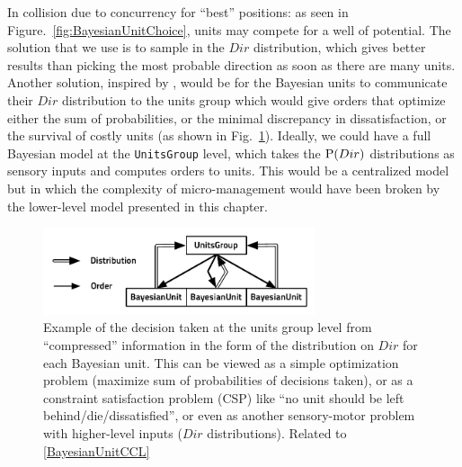 In collision due to concurrency for ``best'' positions: as seen in Figure.~\ref{fig:BayesianUnitChoice}, units may compete for a well of potential. The solution that we use is to sample in the $Dir$ distribution, which gives better results than picking the most probable direction as soon as there are many units. Another solution, inspired by \citep{Marthi05concurrenthierarchical}, would be for the Bayesian units to communicate their $Dir$ distribution to the units group which would give orders that optimize either the sum of probabilities, or the minimal discrepancy in dissatisfaction, or the survival of costly units (as shown in Fig.~\ref{fig:BayesianUnitsGroup}). Ideally, we could have a full Bayesian model at the \texttt{UnitsGroup} level, which takes the $\mathrm{P}(Dir)$ distributions as sensory inputs and computes orders to units. This would be a centralized model but in which the complexity of micro-management would have been broken by the lower-level model presented in this chapter.

\begin{figure}[h]
\begin{center}
\includegraphics[width=8cm]{images/UnitsGroup_BayesianUnits.pdf}
\caption{Example of the decision taken at the units group level from ``compressed'' information in the form of the distribution on $Dir$ for each Bayesian unit. This can be viewed as a simple optimization problem (maximize sum of probabilities of decisions taken), or as a constraint satisfaction problem (CSP) like ``no unit should be left behind/die/dissatisfied'', or even as another sensory-motor problem with higher-level inputs ($Dir$ distributions). Related to \ref{BayesianUnitCCL}}
\label{fig:BayesianUnitsGroup}
\end{center}
\end{figure}

